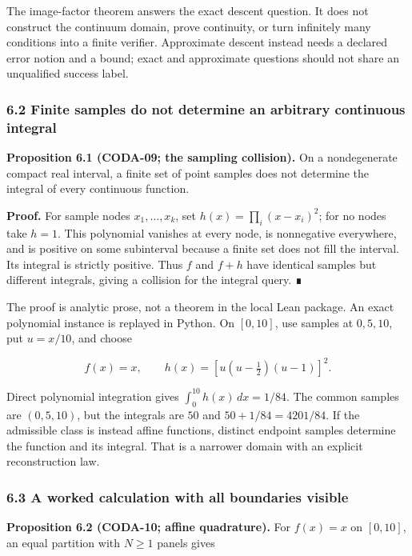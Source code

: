 \documentclass[
  11pt,
]{article}
\begin{document}
The image-factor theorem answers the exact descent question. It does not construct the continuum domain, prove continuity, or turn infinitely many conditions into a finite verifier. Approximate descent instead needs a declared error notion and a bound; exact and approximate questions should not share an unqualified success label.

\subsubsection{6.2 Finite samples do not determine an arbitrary continuous integral}\label{finite-samples-do-not-determine-an-arbitrary-continuous-integral}

\textbf{Proposition 6.1 (CODA-09; the sampling collision).} On a nondegenerate compact real interval, a finite set of point samples does not determine the integral of every continuous function.

\textbf{Proof.} For sample nodes \(x_1,\ldots,x_k\), set \(h(x)=\prod_i(x-x_i)^2\); for no nodes take \(h=1\). This polynomial vanishes at every node, is nonnegative everywhere, and is positive on some subinterval because a finite set does not fill the interval. Its integral is strictly positive. Thus \(f\) and \(f+h\) have identical samples but different integrals, giving a collision for the integral query. ∎

The proof is analytic prose, not a theorem in the local Lean package. An exact polynomial instance is replayed in Python. On \([0,10]\), use samples at \(0,5,10\), put \(u=x/10\), and choose

\[
 f(x)=x,\qquad h(x)=[u(u-\tfrac12)(u-1)]^2.
\]

Direct polynomial integration gives \(\int_0^{10}h(x)\,dx=1/84\). The common samples are \((0,5,10)\), but the integrals are \(50\) and \(50+1/84=4201/84\). If the admissible class is instead affine functions, distinct endpoint samples determine the function and its integral. That is a narrower domain with an explicit reconstruction law.

\subsubsection{6.3 A worked calculation with all boundaries visible}\label{a-worked-calculation-with-all-boundaries-visible}

\textbf{Proposition 6.2 (CODA-10; affine quadrature).} For \(f(x)=x\) on \([0,10]\), an equal partition with \(N\ge1\) panels gives
\end{document}
